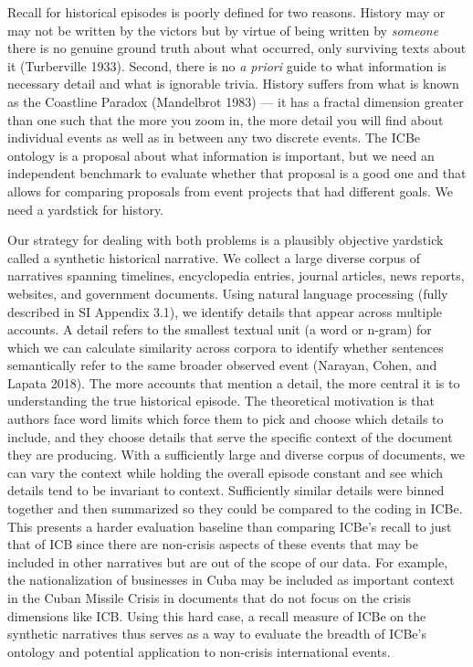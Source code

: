 \documentclass{article}
\begin{document}
Recall for historical episodes is poorly defined for two reasons.
History may or may not be written by the victors but by virtue of being
written by \emph{someone} there is no genuine ground truth about what
occurred, only surviving texts about it (Turberville 1933). Second,
there is no \emph{a priori} guide to what information is necessary
detail and what is ignorable trivia. History suffers from what is known
as the Coastline Paradox (Mandelbrot 1983) --- it has a fractal
dimension greater than one such that the more you zoom in, the more
detail you will find about individual events as well as in between any
two discrete events. The ICBe ontology is a proposal about what
information is important, but we need an independent benchmark to
evaluate whether that proposal is a good one and that allows for
comparing proposals from event projects that had different goals. We
need a yardstick for history.

Our strategy for dealing with both problems is a plausibly objective
yardstick called a synthetic historical narrative. We collect a large
diverse corpus of narratives spanning timelines, encyclopedia entries,
journal articles, news reports, websites, and government documents.
Using natural language processing (fully described in SI Appendix 3.1),
we identify details that appear across multiple accounts. A detail
refers to the smallest textual unit (a word or n-gram) for which we can
calculate similarity across corpora to identify whether sentences
semantically refer to the same broader observed event (Narayan, Cohen,
and Lapata 2018). The more accounts that mention a detail, the more
central it is to understanding the true historical episode. The
theoretical motivation is that authors face word limits which force them
to pick and choose which details to include, and they choose details
that serve the specific context of the document they are producing. With
a sufficiently large and diverse corpus of documents, we can vary the
context while holding the overall episode constant and see which details
tend to be invariant to context. Sufficiently similar details were
binned together and then summarized so they could be compared to the
coding in ICBe. This presents a harder evaluation baseline than
comparing ICBe's recall to just that of ICB since there are non-crisis
aspects of these events that may be included in other narratives but are
out of the scope of our data. For example, the nationalization of
businesses in Cuba may be included as important context in the Cuban
Missile Crisis in documents that do not focus on the crisis dimensions
like ICB. Using this hard case, a recall measure of ICBe on the
synthetic narratives thus serves as a way to evaluate the breadth of
ICBe's ontology and potential application to non-crisis international
events.
\end{document}
